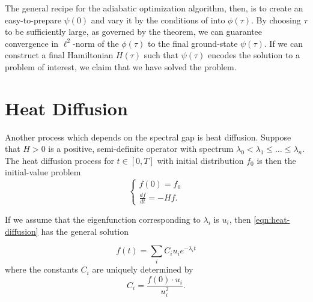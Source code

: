 	The general recipe for the adiabatic optimization algorithm, then, is to create an easy-to-prepare $\psi(0)$ and vary it by the conditions of  into $\phi(\tau)$. By choosing $\tau$ to be sufficiently large, as governed by the theorem, we can guarantee convergence in $\ell^2$-norm of the $\phi(\tau)$ to the final ground-state $\psi(\tau)$. If we can construct a final Hamiltonian $H(\tau)$ such that $\psi(\tau)$ encodes the solution to a problem of interest, we claim that we have solved the problem. 


\section{Heat Diffusion}\label{sec:heat-diffusion}
    Another process which depends on the spectral gap is heat diffusion. Suppose that $H > 0$ is a positive, semi-definite operator with spectrum $\lambda_0 < \lambda_1 \leq \dots \leq \lambda_n$. The heat diffusion process for $t \in [0,T]$ with initial distribution $f_0$ is then the initial-value problem
    \begin{equation}\label{eqn:heat-diffusion}
        \begin{cases}
            f(0) = f_0 \\
            \frac{d f}{d t} = - H f.
        \end{cases}
    \end{equation}
    
    If we assume that the eigenfunction corresponding to $\lambda_i$ is $u_i$, then \cref{eqn:heat-diffusion} has the general solution
    
    \begin{equation}\label{eqn:heat-sol}
        f(t) = \sum_i C_i u_i e^{-\lambda_i t}
    \end{equation}
    where the constants $C_i$ are uniquely determined by 
    \[
        C_i = \frac{f(0) \cdot u_i}{u_i^2}.
    \]
    
